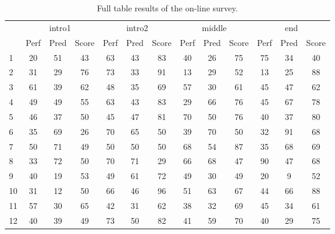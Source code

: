 \begin{table}
\centering
 
  \footnotesize
\begin{tabular}{l|ccc|ccc|ccc|ccc}

\hline
\multicolumn{1}{c}{\multirow{2}{*}{}} & \multicolumn{3}{c}{intro1} & \multicolumn{3}{c}{intro2} & \multicolumn{3}{c}{middle}  & \multicolumn{3}{c}{end} \\ 
\multicolumn{1}{c}{}                      & \multicolumn{1}{c}{Perf} & \multicolumn{1}{c}{Pred} & \multicolumn{1}{c}{Score} & \multicolumn{1}{c}{Perf} & \multicolumn{1}{c}{Pred} & \multicolumn{1}{c}{Score} & \multicolumn{1}{c}{Perf} & \multicolumn{1}{c}{Pred} & \multicolumn{1}{c}{Score} & \multicolumn{1}{c}{Perf} & \multicolumn{1}{c}{Pred} & \multicolumn{1}{c}{Score} \\ \hline
1 & 20 & 51 & 43 & 63 & 43 & 83 & 40 & 26 & 75 & 75 & 34 & 40 \\ 
2 & 31 & 29 & 76 & 73 & 33 & 91 & 13 & 29 & 52 & 13 & 25 & 88 \\ 
3 & 61 & 39 & 62 & 48 & 35 & 69 & 57 & 30 & 61 & 45 & 47 & 62 \\
4 & 49 & 49 & 55 & 63 & 43 & 83 & 29 & 66 & 76 & 45 & 67 & 78 \\
5 & 46 & 37 & 50 & 45 & 47 & 81 & 70 & 50 & 76 & 40 & 37 & 80 \\ 
6 & 35 & 69 & 26 & 70 & 65 & 50 & 39 & 70 & 50 & 32 & 91 & 68 \\
7 & 50 & 71 & 49 & 50 & 50 & 50 & 68 & 54 & 87 & 35 & 68 & 69 \\
8 & 33 & 72 & 50 & 70 & 71 & 29 & 66 & 68 & 47 & 90 & 47 & 68 \\
9 & 40 & 19 & 53 & 49 & 61 & 72 & 49 & 30 & 49 & 20 & 9 & 52 \\
10 & 31 & 12 & 50 & 66 & 46 & 96 & 51 & 63 & 67 & 44 & 66 & 88 \\ 
11 & 57 & 30 & 65 & 42 & 31 & 62 & 38 & 32 & 69 & 45 & 34 & 61 \\ 
12 & 40 & 39 & 49 & 73 & 50 & 82 & 41 & 59 & 70 & 40 & 29 & 75 \\ \hline                  
\end{tabular}


 \caption[Full table results of the on-line survey.]{Full table results of the on-line survey.}
  \label{tab:survey_results}
\end{table}